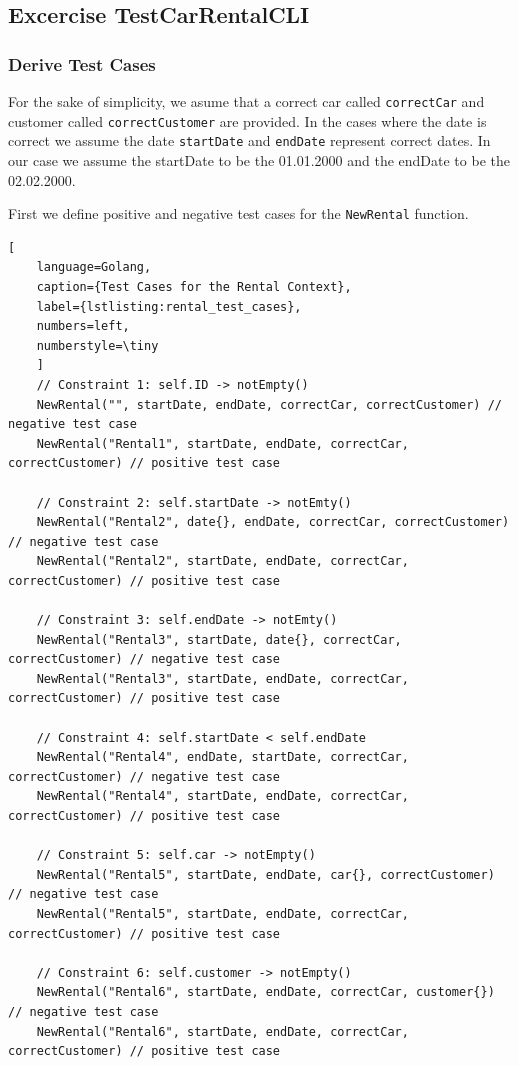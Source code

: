 \subsection{Excercise TestCarRentalCLI}
\label{sec:exercise_test_car_rental_cli}

\subsubsection*{Derive Test Cases}
For the sake of simplicity, we asume that a correct car called \texttt{correctCar} and customer called \texttt{correctCustomer} are provided.
In the cases where the date is correct we assume the date \texttt{startDate} and \texttt{endDate} represent correct dates.
In our case we assume the startDate to be the 01.01.2000 and the endDate to be the 02.02.2000.

First we define positive and negative test cases for the \texttt{NewRental} function.
\begin{lstlisting}[
    language=Golang,
    caption={Test Cases for the Rental Context},
    label={lstlisting:rental_test_cases},
    numbers=left,
    numberstyle=\tiny
    ]
    // Constraint 1: self.ID -> notEmpty()
    NewRental("", startDate, endDate, correctCar, correctCustomer) // negative test case
    NewRental("Rental1", startDate, endDate, correctCar, correctCustomer) // positive test case

    // Constraint 2: self.startDate -> notEmty()
    NewRental("Rental2", date{}, endDate, correctCar, correctCustomer) // negative test case
    NewRental("Rental2", startDate, endDate, correctCar, correctCustomer) // positive test case

    // Constraint 3: self.endDate -> notEmty()
    NewRental("Rental3", startDate, date{}, correctCar, correctCustomer) // negative test case
    NewRental("Rental3", startDate, endDate, correctCar, correctCustomer) // positive test case

    // Constraint 4: self.startDate < self.endDate
    NewRental("Rental4", endDate, startDate, correctCar, correctCustomer) // negative test case
    NewRental("Rental4", startDate, endDate, correctCar, correctCustomer) // positive test case

    // Constraint 5: self.car -> notEmpty()
    NewRental("Rental5", startDate, endDate, car{}, correctCustomer) // negative test case
    NewRental("Rental5", startDate, endDate, correctCar, correctCustomer) // positive test case

    // Constraint 6: self.customer -> notEmpty()
    NewRental("Rental6", startDate, endDate, correctCar, customer{}) // negative test case
    NewRental("Rental6", startDate, endDate, correctCar, correctCustomer) // positive test case
\end{lstlisting}
  
